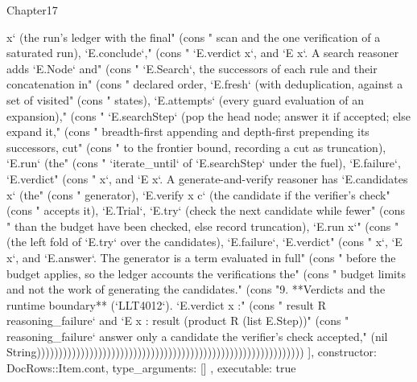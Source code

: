 \begin{lexlean}{Chapter17}
\begin{semanticmodule}
{{x` (the run's ledger with the final" (cons "   scan and the one verification of a saturated run), `E.conclude`," (cons "   `E.verdict x`, and `E x`. A search reasoner adds `E.Node` and" (cons "   `E.Search`, the successors of each rule and their concatenation in" (cons "   declared order, `E.fresh` (with deduplication, against a set of visited" (cons "   states), `E.attempts` (every guard evaluation of an expansion)," (cons "   `E.searchStep` (pop the head node; answer it if accepted; else expand it," (cons "   breadth-first appending and depth-first prepending its successors, cut" (cons "   to the frontier bound, recording a cut as truncation), `E.run` (the" (cons "   `iterate_until` of `E.searchStep` under the fuel), `E.failure`, `E.verdict" (cons "   x`, and `E x`. A generate-and-verify reasoner has `E.candidates x` (the" (cons "   generator), `E.verify x c` (the candidate if the verifier's check" (cons "   accepts it), `E.Trial`, `E.try` (check the next candidate while fewer" (cons "   than the budget have been checked, else record truncation), `E.run x`" (cons "   (the left fold of `E.try` over the candidates), `E.failure`, `E.verdict" (cons "   x`, `E x`, and `E.answer`. The generator is a term evaluated in full" (cons "   before the budget applies, so the ledger accounts the verifications the" (cons "   budget limits and not the work of generating the candidates." (cons "9. **Verdicts and the runtime boundary** (`LLT4012`). `E.verdict x :" (cons "   result R reasoning_failure` and `E x : result (product R (list E.Step))" (cons "   reasoning_failure` answer only a candidate the verifier's check accepted," (nil String)))))))))))))))))))))))))))))))))))))))))))))))))))))))))))))
    ],
    constructor: DocRows::Item.cont,
    type_arguments: []
  },
  executable: true
}


\end{semanticmodule}
\end{lexlean}
